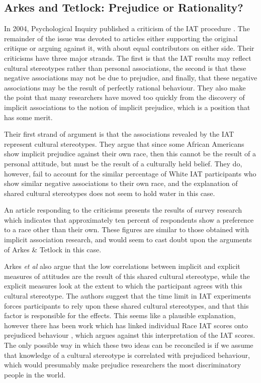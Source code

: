 \subsection{Arkes and Tetlock: Prejudice or Rationality?}
\label{sec:arkes-tetl-prej}

In 2004, Psychological Inquiry published a criticism of the IAT procedure \cite{Arkes2004}. The remainder of the issue was devoted to articles either supporting the original critique or arguing against it, with about equal contributors on either side. Their criticisms have three major strands. The first is that the IAT results may reflect cultural stereotypes rather than personal associations, the second is that these negative associations may not be due to prejudice, and finally, that these negative associations may be the result of perfectly rational behaviour. They also make the point that many researchers have moved too quickly from the discovery of implicit associations to the notion of implicit prejudice, which is a position that has some merit. 

Their first strand of argument is that the associations revealed by the IAT represent cultural stereotypes. They argue that since some African Americans show implicit prejudice against their own race, then this cannot be the result of a personal attitude, but must be the result of a culturally held belief. They do, however, fail to account for the similar percentage of White IAT participants who show similar negative associations to their own race, and the explanation of shared cultural stereotypes does not seem to hold water in this case. 

An article responding to the criticisms \cite{Sears2004} presents the results of survey research which indicates that approximately ten percent of respondents show a preference to a race other than their own. These figures are similar to those obtained with implicit association research, and would seem to cast doubt upon the arguments of Arkes \& Tetlock in this case. 

Arkes  \textit{et al} also argue that the low correlations between implicit and explicit measures of attitudes are the result of this shared cultural stereotype, while the explicit measures look at the extent to which the participant agrees with this cultural stereotype. The authors suggest that the time limit in IAT experiments forces participants to rely upon these shared cultural stereotypes, and that this factor is responsible for the effects. This seems like a plausible explanation, however there has been work which has linked individual Race IAT scores onto prejudiced behaviour \cite{Heider2007}, which argues against this interpretation of the IAT scores. The only possible way in which these two ideas can be reconciled is if we assume that knowledge of a cultural stereotype is correlated with prejudiced behaviour, which would presumably make prejudice researchers the most discriminatory people in the world. 

